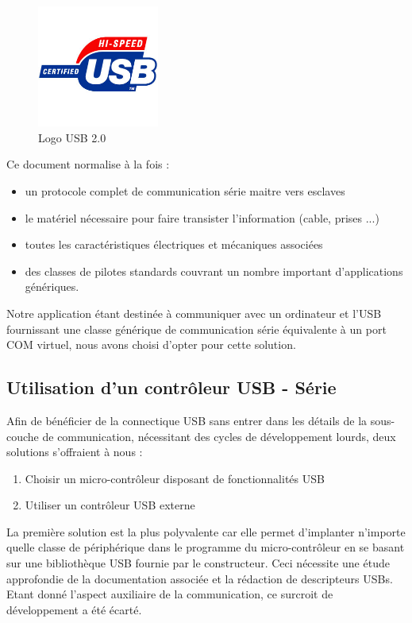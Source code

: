 \documentclass[11pt, french]{article} %
\begin{document}
\begin{figure}
	\includegraphics[width = 4cm]{SolutionNumerique/usb-logo.jpg}
	\caption{Logo USB 2.0}
\end{figure}

\medskip
Ce document normalise à la fois : 
\medskip
\begin{itemize}
	\item un protocole complet de communication série maitre vers esclaves
	\item le matériel nécessaire pour faire transister l'information (cable, prises ...)
	\item toutes les caractéristiques électriques et mécaniques associées
	\item des classes de pilotes standards couvrant un nombre important d'applications génériques.
\end{itemize}

\medskip
Notre application étant destinée à communiquer avec un ordinateur et l'USB fournissant une classe générique de communication série équivalente à un port COM virtuel, nous avons choisi d'opter pour cette solution.

\subsection{Utilisation d'un contrôleur USB - Série}

	Afin de bénéficier de la connectique USB sans entrer dans les détails de la sous-couche de communication, nécessitant des cycles de développement lourds, deux solutions s'offraient à nous :

\medskip
\begin{enumerate}
	\item Choisir un micro-contrôleur disposant de fonctionnalités USB
	\item Utiliser un contrôleur USB externe
\end{enumerate}

\medskip
La première solution est la plus polyvalente car elle permet d'implanter n'importe quelle classe de périphérique dans le programme du micro-contrôleur en se basant sur une bibliothèque USB fournie par le constructeur. Ceci nécessite une étude approfondie de la documentation associée et la rédaction de descripteurs USBs. Etant donné l'aspect auxiliaire de la communication, ce surcroit de développement a été écarté.
\end{document}
